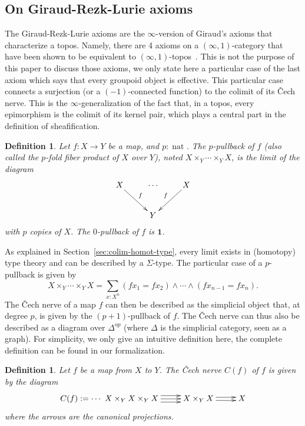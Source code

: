 \documentclass[conference]{IEEEtran}
\makeatletter
\newtheorem{defi}[thm]{Definition}
\def\dar[#1]#2{\ar@<-#2>[#1]\ar@<#2>[#1]} %
\def\tar[#1]#2{\ar@<#2>[#1]\ar@<0pt>[#1]\ar@<-#2>[#1]} %
\DeclareMathOperator{\nat}{nat}
\newcommand \one {\mathbf{1}}
\makeatother
\begin{document}
\subsection{On Giraud-Rezk-Lurie axioms}
\label{sec:giraud-ax}

The Giraud-Rezk-Lurie axioms are the $\infty$-version of Giraud's
axioms that characterize a topos. Namely, there are 4 axioms on a
$(\infty,1)$-category that have been shown to be equivalent to
$(\infty,1)$-topos~\cite[Chapter 6]{lurie}. This is not the purpose of
this paper to discuss those axioms, we only state here a particular
case of the last axiom which says that every groupoid object is
effective.
%
This particular case connects a surjection (or a $(-1)$-connected
function) to the colimit of its \v{C}ech nerve.
%
This is the $\infty$-generalization of the fact that, in a topos,
every epimorphism is the colimit of its kernel pair, which plays a
central part in the definition of sheafification.

\begin{defi}
  Let $f:X \to Y$ be a map, and $p:\nat$. The $p$-pullback of $f$
  (also called the $p$-fold fiber product of $X$ over $Y$),
  noted $X\times_Y \cdots\times_Y X$, is
  the limit of the diagram
  $$\xymatrix{
    X \ar[rd]^f & \cdots & X \ar[ld]_f \\
      &    Y   &
  }$$
  with $p$ copies of $X$. The $0$-pullback of $f$ is $\one$.
\end{defi}

As explained in Section~\ref{sec:colim-homot-type}, every limit exists
in (homotopy) type theory and can be described by a $\Sigma$-type. 
%
The particular case of a $p$-pullback is given by
%
$$
X\times_Y \cdots\times_Y X = \sum_{x:X^n} (f x_1 = f x_2) \land
\cdots \land (f x_{n-1} = f x_n).
$$
%
The \v{C}ech nerve of a map $f$ can then be described as the
simplicial object that, at degree $p$, is given by the
$(p+1)$-pullback of $f$. The \v{C}ech nerve can thus also be described
as a diagram over $\Delta^{op}$ (where $\Delta$ is the simplicial
category, seen as a graph). For simplicity, we only give an intuitive
definition here, the complete definition can be found in our
formalization.
%
\begin{defi}
  Let $f$ be a map from $X$ to $Y$. The {\em \v{C}ech nerve} $C(f)$ of $f$
  is given by the diagram
  $$\xymatrix{
    C(f) := \cdots~ X \times_Y X \times_Y X \tar[r]{4pt} & X \times_Y X \dar[r]{2pt} & X
  }$$
where the arrows are the canonical projections.
\end{defi}
\end{document}
